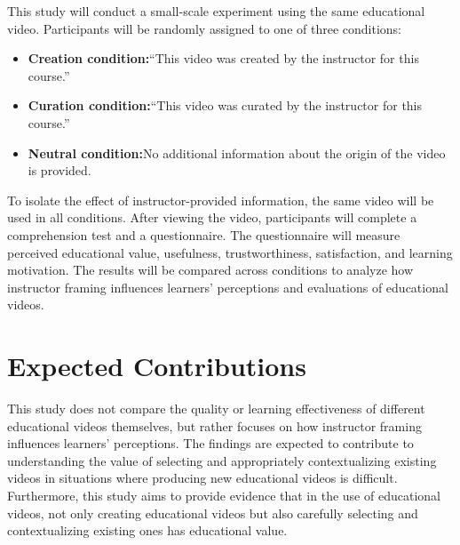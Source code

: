 \documentclass[a4paper,11pt]{article}
\begin{document}
This study will conduct a small-scale experiment using the same educational video.
Participants will be randomly assigned to one of three conditions:

\begin{itemize}
  \item \textbf{Creation condition:}“This video was created by the instructor for this course.”
  \item \textbf{Curation condition:}“This video was curated by the instructor for this course.”
  \item \textbf{Neutral condition:}No additional information about the origin of the video is provided.
\end{itemize}

To isolate the effect of instructor-provided information, the same video will be used in all conditions.
After viewing the video, participants will complete a comprehension test and a questionnaire. The questionnaire will measure perceived educational value, usefulness, trustworthiness, satisfaction, and learning motivation.
The results will be compared across conditions to analyze how instructor framing influences learners’ perceptions and evaluations of educational videos.

\section{Expected Contributions}

This study does not compare the quality or learning effectiveness of different educational videos themselves, but rather focuses on how instructor framing influences learners’ perceptions.
The findings are expected to contribute to understanding the value of selecting and appropriately contextualizing existing videos in situations where producing new educational videos is difficult.
Furthermore, this study aims to provide evidence that in the use of educational videos, not only creating educational videos but also carefully selecting and contextualizing existing ones has educational value.
\end{document}
